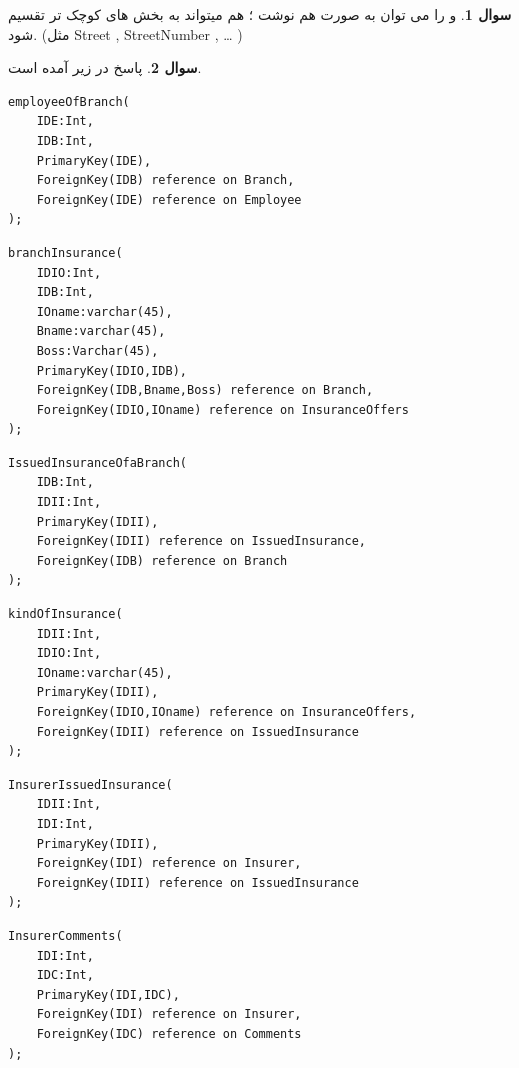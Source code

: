 \documentclass[12pt]{article}
\theoremstyle{definition}
\newtheorem{question}{سوال}
\begin{document}
\begin{question}
و 
را می توان به صورت  
هم نوشت ؛  
هم میتواند به بخش های کوچک تر تقسیم شود.
(مثل 
Street
,
StreetNumber
,
 \dots 
)








\end{question}

\begin{question}
پاسخ در زیر آمده است.

\begin{latin}
\begin{lstlisting}	
employeeOfBranch(
	IDE:Int,
	IDB:Int,
	PrimaryKey(IDE),
	ForeignKey(IDB) reference on Branch,
	ForeignKey(IDE) reference on Employee
);
\end{lstlisting}
\end{latin}
\begin{latin}
\begin{lstlisting}
branchInsurance(
	IDIO:Int,
	IDB:Int,
	IOname:varchar(45),
	Bname:varchar(45),
	Boss:Varchar(45),
	PrimaryKey(IDIO,IDB),
	ForeignKey(IDB,Bname,Boss) reference on Branch,
	ForeignKey(IDIO,IOname) reference on InsuranceOffers
);
\end{lstlisting}
\end{latin}
\begin{latin}
\begin{lstlisting}
IssuedInsuranceOfaBranch(
	IDB:Int,
	IDII:Int,
	PrimaryKey(IDII),
	ForeignKey(IDII) reference on IssuedInsurance,
	ForeignKey(IDB) reference on Branch
);
\end{lstlisting}
\end{latin}
\begin{latin}
\begin{lstlisting}
kindOfInsurance(
	IDII:Int,
	IDIO:Int,
	IOname:varchar(45),
	PrimaryKey(IDII),
	ForeignKey(IDIO,IOname) reference on InsuranceOffers,
	ForeignKey(IDII) reference on IssuedInsurance
);
\end{lstlisting}
\end{latin}
\begin{latin}
\begin{lstlisting}
InsurerIssuedInsurance(
	IDII:Int,
	IDI:Int,
	PrimaryKey(IDII),
	ForeignKey(IDI) reference on Insurer,
	ForeignKey(IDII) reference on IssuedInsurance
);
\end{lstlisting}
\end{latin}
\begin{latin}
\begin{lstlisting}
InsurerComments(
	IDI:Int,
	IDC:Int,
	PrimaryKey(IDI,IDC),
	ForeignKey(IDI) reference on Insurer,
	ForeignKey(IDC) reference on Comments
);
\end{lstlisting}
\end{latin}

\end{question}
\end{document}

